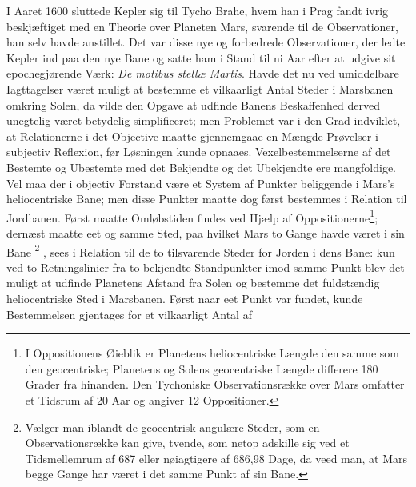 \documentclass[12pt,a4paper]{book}
\renewcommand{\thefootnote}{*)}
\begin{document}
I Aaret 1600 sluttede Kepler sig til Tycho Brahe, hvem han i Prag fandt
ivrig beskjæftiget med en Theorie over Planeten Mars, svarende til de
Observationer, han selv
havde anstillet. Det var disse nye og forbedrede Observationer, der
ledte Kepler ind paa den nye Bane og satte ham i Stand til ni Aar efter
at udgive sit epochegjørende Værk:
\textit{De motibus stellæ Martis}. Havde det nu ved umiddelbare
Iagttagelser været muligt at bestemme et vilkaarligt Antal Steder i
Marsbanen omkring Solen, da vilde den Opgave at udfinde Banens
Beskaffenhed derved unegtelig været betydelig simplificeret; men
Problemet var i den Grad indviklet, at Relationerne i det Objective
maatte gjennemgaae en Mængde Prøvelser i subjectiv Reflexion, før
Løsningen kunde opnaaes. Vexelbestemmelserne af det Bestemte og
Ubestemte med det Bekjendte og det Ubekjendte ere mangfoldige. Vel maa
der i objectiv Forstand være et System af Punkter beliggende i Mars's
heliocentriske Bane; men disse Punkter maatte dog først bestemmes i
Relation til Jordbanen. Først maatte Omløbstiden findes ved Hjælp af
Oppositionerne\footnote{%
I Oppositionens Øieblik er Planetens heliocentriske Længde den samme som
den geocentriske; Planetens og Solens geocentriske Længde differere 180
Grader fra hinanden. Den Tychoniske Observationsrække over Mars omfatter
et Tidsrum af 20 Aar og angiver 12 Oppositioner.}; dernæst maatte eet og
samme Sted, paa hvilket Mars to Gange havde været i sin Bane%
\renewcommand{\thefootnote}{**)}%
\footnote{%
Vælger man iblandt de geocentrisk angulære Steder, som en
Observationsrække kan give, tvende, som netop adskille sig ved et
Tidsmellemrum af 687 eller nøiagtigere af 686,98 Dage, da veed man, at
Mars begge Gange har været i det samme Punkt af sin Bane.}%
\renewcommand{\thefootnote}{*)}%
, sees i Relation til de to tilsvarende Steder for Jorden i dens Bane:
kun ved to Retningslinier fra to bekjendte Standpunkter imod samme Punkt
blev det muligt at udfinde Planetens Afstand fra Solen og bestemme det
fuldstændig heliocentriske Sted i Marsbanen. Først naar eet Punkt var
fundet, kunde Bestemmelsen gjentages for et vilkaarligt Antal af
\end{document}
